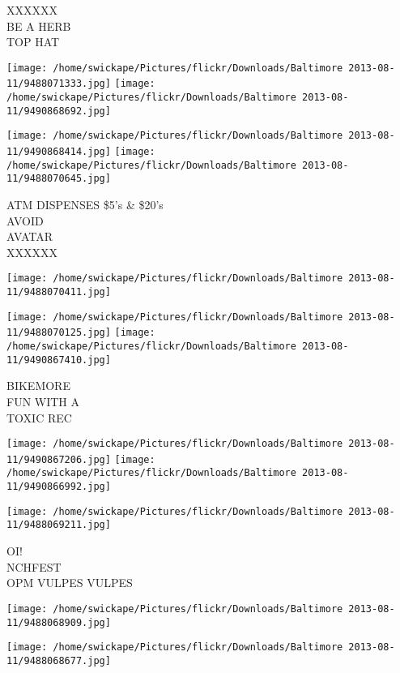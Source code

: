 \documentclass[10pt,letterpaper]{article}
\begin{document}
XXXXXX\\
BE A HERB\\
TOP HAT\\
\pagebreak

\texttt{[image: /home/swickape/Pictures/flickr/Downloads/Baltimore 2013-08-11/9488071333.jpg]}
\texttt{[image: /home/swickape/Pictures/flickr/Downloads/Baltimore 2013-08-11/9490868692.jpg]}

\texttt{[image: /home/swickape/Pictures/flickr/Downloads/Baltimore 2013-08-11/9490868414.jpg]}
\texttt{[image: /home/swickape/Pictures/flickr/Downloads/Baltimore 2013-08-11/9488070645.jpg]}

ATM DISPENSES \$5's \& \$20's\\
AVOID\\
AVATAR\\
XXXXXX\\
\pagebreak

\texttt{[image: /home/swickape/Pictures/flickr/Downloads/Baltimore 2013-08-11/9488070411.jpg]}

\vspace{0.25in}
\texttt{[image: /home/swickape/Pictures/flickr/Downloads/Baltimore 2013-08-11/9488070125.jpg]}
\texttt{[image: /home/swickape/Pictures/flickr/Downloads/Baltimore 2013-08-11/9490867410.jpg]}

BIKEMORE\\
FUN WITH A\\
TOXIC REC\\
\pagebreak

\texttt{[image: /home/swickape/Pictures/flickr/Downloads/Baltimore 2013-08-11/9490867206.jpg]}
\texttt{[image: /home/swickape/Pictures/flickr/Downloads/Baltimore 2013-08-11/9490866992.jpg]}

\vspace{0.25in}
\texttt{[image: /home/swickape/Pictures/flickr/Downloads/Baltimore 2013-08-11/9488069211.jpg]}

OI!\\
NCHFEST\\
OPM VULPES VULPES\\
\pagebreak

\texttt{[image: /home/swickape/Pictures/flickr/Downloads/Baltimore 2013-08-11/9488068909.jpg]}

\vspace{0.25in}
\texttt{[image: /home/swickape/Pictures/flickr/Downloads/Baltimore 2013-08-11/9488068677.jpg]}
\end{document}
